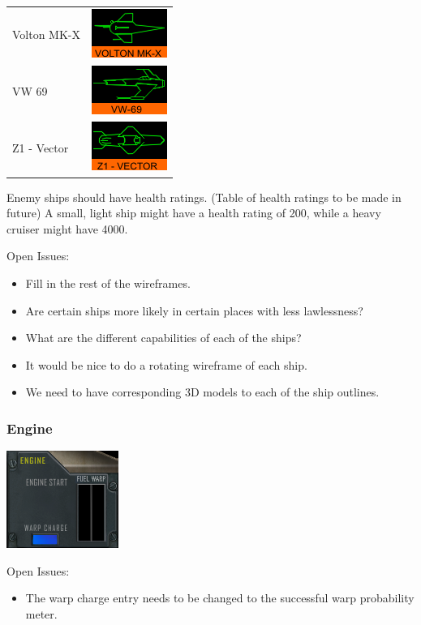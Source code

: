 \begin{itemize}
\begin{tabular}{ | l | l | }
Volton MK-X & \includegraphics{images/ship_volton_mk_x.png} \\
VW 69 & \includegraphics{images/ship_VW-69.png} \\
Z1 - Vector & \includegraphics{images/ship_z1_vector.png} \\
\hline
\end{tabular}

Enemy ships should have health ratings. (Table of health ratings to be made in future) A small, light ship might have a health rating of 200, while a heavy cruiser might have 4000. 


Open Issues:
\begin{itemize}
\item Fill in the rest of the wireframes.
\item Are certain ships more likely in certain places with less lawlessness?
\item What are the different capabilities of each of the ships?
\item It would be nice to do a rotating wireframe of each ship.
\item We need to have corresponding 3D models to each of the ship outlines.
\end{itemize}

\subsubsection{Engine}
\includegraphics[scale=0.70]{images/engine.png}

Open Issues:
\begin{itemize}
\item The warp charge entry needs to be changed to the successful warp
probability meter.
\end{itemize}


\end{itemize}
